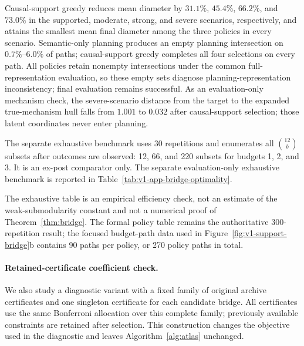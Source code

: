 \documentclass[11pt]{article}
\numberwithin{equation}{section}
\newcommand{\1}{\mathbf 1}
\begin{document}


Causal-support greedy reduces mean diameter by $31.1\%$, $45.4\%$, $66.2\%$, and $73.0\%$ in the supported, moderate, strong, and severe scenarios, respectively, and attains the smallest mean final diameter among the three policies in every scenario.  Semantic-only planning produces an empty planning intersection on $0.7\%$--$6.0\%$ of paths; causal-support greedy completes all four selections on every path.  All policies retain nonempty intersections under the common full-representation evaluation, so these empty sets diagnose planning-representation inconsistency; final evaluation remains successful.  As an evaluation-only mechanism check, the severe-scenario distance from the target to the expanded true-mechanism hull falls from $1.001$ to $0.032$ after causal-support selection; those latent coordinates never enter planning.

The separate exhaustive benchmark uses 30 repetitions and enumerates all $\binom{12}{b}$ subsets after outcomes are observed: 12, 66, and 220 subsets for budgets 1, 2, and 3.  It is an ex-post comparator only. The separate evaluation-only exhaustive benchmark is reported in Table~\ref{tab:v1-app-bridge-optimality}.



The exhaustive table is an empirical efficiency check, not an estimate of the weak-submodularity constant and not a numerical proof of Theorem~\ref{thm:bridge}.  The formal policy table remains the authoritative 300-repetition result; the focused budget-path data used in Figure~\ref{fig:v1-support-bridge}b contains 90 paths per policy, or 270 policy paths in total.


\paragraph{Retained-certificate coefficient check.}
We also study a diagnostic variant with a fixed family of original archive certificates and one singleton certificate for each candidate bridge. All certificates use the same Bonferroni allocation over this complete family; previously available constraints are retained after selection. This construction changes the objective used in the diagnostic and leaves Algorithm~\ref{alg:atlas} unchanged.
\end{document}
